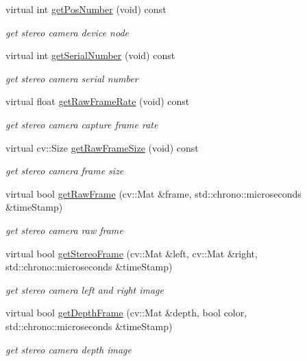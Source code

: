 \begin{DoxyCompactItemize}
virtual int \hyperlink{class_stereo_camera_ab844029084a9a9de0996c1e7b24c258c}{get\+Pos\+Number} (void) const
\begin{DoxyCompactList}\small\item\em get stereo camera device node \end{DoxyCompactList}\item 
virtual int \hyperlink{class_stereo_camera_a3cb43015d545854892dd2e4057f5b2be}{get\+Serial\+Number} (void) const
\begin{DoxyCompactList}\small\item\em get stereo camera serial number \end{DoxyCompactList}\item 
virtual float \hyperlink{class_stereo_camera_ac92c3a60ae0c38e203c81bb2a2738eb4}{get\+Raw\+Frame\+Rate} (void) const
\begin{DoxyCompactList}\small\item\em get stereo camera capture frame rate \end{DoxyCompactList}\item 
virtual cv\+::\+Size \hyperlink{class_stereo_camera_a38c990b26167c2f7823b20f44b1a8fa7}{get\+Raw\+Frame\+Size} (void) const
\begin{DoxyCompactList}\small\item\em get stereo camera frame size \end{DoxyCompactList}\item 
virtual bool \hyperlink{class_stereo_camera_ac8fbb6e1ebd828b1640d43ad7cdc0f9c}{get\+Raw\+Frame} (cv\+::\+Mat \&frame, std\+::chrono\+::microseconds \&time\+Stamp)
\begin{DoxyCompactList}\small\item\em get stereo camera raw frame \end{DoxyCompactList}\item 
virtual bool \hyperlink{class_stereo_camera_aa25f48d95ba8d1c71fb0e40b53f68379}{get\+Stereo\+Frame} (cv\+::\+Mat \&left, cv\+::\+Mat \&right, std\+::chrono\+::microseconds \&time\+Stamp)
\begin{DoxyCompactList}\small\item\em get stereo camera left and right image \end{DoxyCompactList}\item 
virtual bool \hyperlink{class_stereo_camera_aa0bd7e3a7ab4fcf2598ac4e780a27cb3}{get\+Depth\+Frame} (cv\+::\+Mat \&depth, bool color, std\+::chrono\+::microseconds \&time\+Stamp)
\begin{DoxyCompactList}\small\item\em get stereo camera depth image \end{DoxyCompactList}\item 

\end{DoxyCompactItemize}
